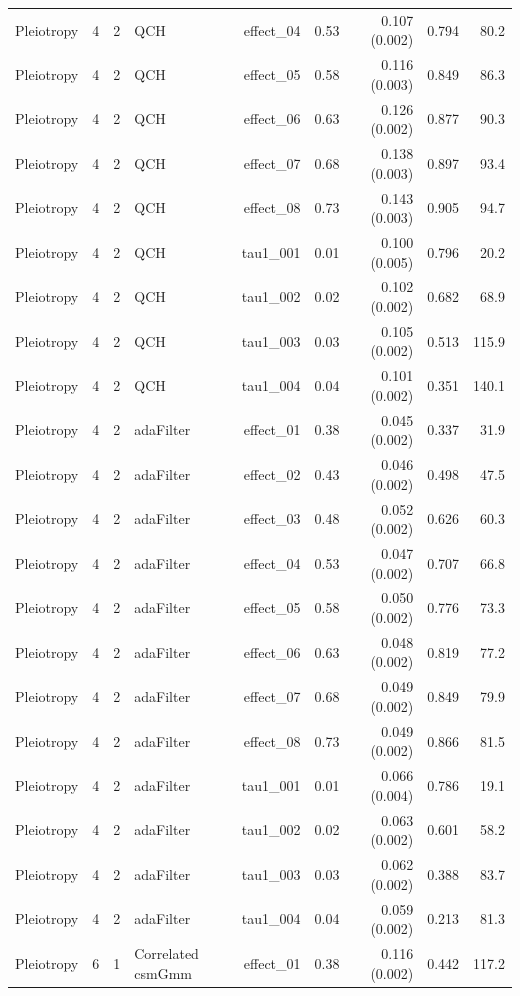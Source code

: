 \begin{longtable}{lcclrrrrr}
Pleiotropy & 4 & 2 & QCH & effect\_04 & 0.53 & 0.107 (0.002) & 0.794 & 80.2\\
Pleiotropy & 4 & 2 & QCH & effect\_05 & 0.58 & 0.116 (0.003) & 0.849 & 86.3\\
Pleiotropy & 4 & 2 & QCH & effect\_06 & 0.63 & 0.126 (0.002) & 0.877 & 90.3\\
Pleiotropy & 4 & 2 & QCH & effect\_07 & 0.68 & 0.138 (0.003) & 0.897 & 93.4\\
Pleiotropy & 4 & 2 & QCH & effect\_08 & 0.73 & 0.143 (0.003) & 0.905 & 94.7\\
Pleiotropy & 4 & 2 & QCH & tau1\_001 & 0.01 & 0.100 (0.005) & 0.796 & 20.2\\
Pleiotropy & 4 & 2 & QCH & tau1\_002 & 0.02 & 0.102 (0.002) & 0.682 & 68.9\\
Pleiotropy & 4 & 2 & QCH & tau1\_003 & 0.03 & 0.105 (0.002) & 0.513 & 115.9\\
Pleiotropy & 4 & 2 & QCH & tau1\_004 & 0.04 & 0.101 (0.002) & 0.351 & 140.1\\
Pleiotropy & 4 & 2 & adaFilter & effect\_01 & 0.38 & 0.045 (0.002) & 0.337 & 31.9\\
Pleiotropy & 4 & 2 & adaFilter & effect\_02 & 0.43 & 0.046 (0.002) & 0.498 & 47.5\\
Pleiotropy & 4 & 2 & adaFilter & effect\_03 & 0.48 & 0.052 (0.002) & 0.626 & 60.3\\
Pleiotropy & 4 & 2 & adaFilter & effect\_04 & 0.53 & 0.047 (0.002) & 0.707 & 66.8\\
Pleiotropy & 4 & 2 & adaFilter & effect\_05 & 0.58 & 0.050 (0.002) & 0.776 & 73.3\\
Pleiotropy & 4 & 2 & adaFilter & effect\_06 & 0.63 & 0.048 (0.002) & 0.819 & 77.2\\
Pleiotropy & 4 & 2 & adaFilter & effect\_07 & 0.68 & 0.049 (0.002) & 0.849 & 79.9\\
Pleiotropy & 4 & 2 & adaFilter & effect\_08 & 0.73 & 0.049 (0.002) & 0.866 & 81.5\\
Pleiotropy & 4 & 2 & adaFilter & tau1\_001 & 0.01 & 0.066 (0.004) & 0.786 & 19.1\\
Pleiotropy & 4 & 2 & adaFilter & tau1\_002 & 0.02 & 0.063 (0.002) & 0.601 & 58.2\\
Pleiotropy & 4 & 2 & adaFilter & tau1\_003 & 0.03 & 0.062 (0.002) & 0.388 & 83.7\\
Pleiotropy & 4 & 2 & adaFilter & tau1\_004 & 0.04 & 0.059 (0.002) & 0.213 & 81.3\\
Pleiotropy & 6 & 1 & Correlated csmGmm & effect\_01 & 0.38 & 0.116 (0.002) & 0.442 & 117.2\\

\end{longtable}
